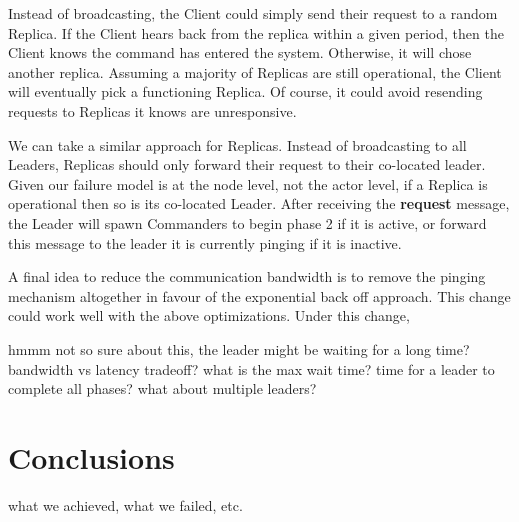 \documentclass{sig-alternate}
\begin{document}
Instead of broadcasting, the Client could simply send their request to a random Replica. If the Client hears back from the replica within a given period, then the Client knows the command has entered the system. Otherwise, it will chose another replica. Assuming a majority of Replicas are still operational, the Client will eventually pick a functioning Replica. Of course, it could avoid resending requests to Replicas it knows are unresponsive.

We can take a similar approach for Replicas. Instead of broadcasting to all Leaders, Replicas should only forward their request to their co-located leader. Given our failure model is at the node level, not the actor level, if a Replica is operational then so is its co-located Leader. After receiving the \textbf{request} message, the Leader will spawn Commanders to begin phase 2 if it is active, or forward this message to the leader it is currently pinging if it is inactive.

A final idea to reduce the communication bandwidth is to remove the pinging mechanism altogether in favour of the exponential back off approach. This change could work well with the above optimizations. Under this change, 

hmmm not so sure about this, the leader might be waiting for a long time? bandwidth vs latency tradeoff? what is the max wait time? time for a leader to complete all phases? what about multiple leaders?

\section{Conclusions}
what we achieved, what we failed, etc.



%
%
\end{document}
